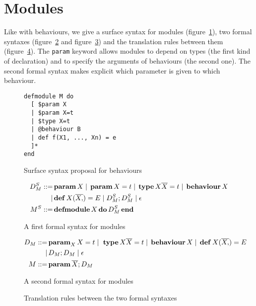 \documentclass[a4paper,11pt]{article}
\newcommand{\kw}[1]{%
  \,\text{\textbf{#1}}\,
}
\newcommand{\pipe}{%
\; | \;
}
\begin{document}
\section{Modules}
Like with behaviours, we give a surface syntax for modules
(figure~\ref{module-surface}), two formal syntaxes (figure~\ref{module-formal1}
and figure~\ref{module-formal2}) and the translation rules between them
(figure~\ref{module-1to2}). The \texttt{param} keyword allows modules to depend
on types (the first kind of declaration) and to specify the arguments of
behaviours (the second one). The second formal syntax makes explicit which
parameter is given to which behaviour.
\begin{figure}[h]
\begin{verbatim}
defmodule M do
  [ $param X
  | $param X=t
  | $type X=t
  | @behaviour B
  | def f(X1, ..., Xn) = e
  ]*
end
\end{verbatim}
\caption{Surface syntax proposal for behaviours}\label{module-surface}
\end{figure}
\begin{figure}[h]
  \begin{align*}
    D_M^S ::=& \kw{param} X \pipe \kw{param} X = t
    \pipe \kw{type} X \overline{X} = t \pipe \kw{behaviour} X \\
    |& \kw{def} X(\overline{X,}) = E \pipe D_M^S; D_M^S \pipe \epsilon \\
    M^S ::=& \kw{defmodule} X \kw{do} D_M^S \kw{end}
  \end{align*}
  \caption{A first formal syntax for modules}\label{module-formal1}
\end{figure}
\begin{figure}[h]
  \begin{align*}
    D_M ::=&\,\text{\textbf{param}}_X\, X = t
    \pipe \,\kw{type}X \overline{X}=t\pipe \kw{behaviour} X
    \pipe \kw{def} X(\overline{X,}) = E\\
    |&\, D_M; D_M \pipe \epsilon \\
    M ::=& \kw{param} \overline{X}; D_M
  \end{align*}
  \caption{A second formal syntax for modules}\label{module-formal2}
\end{figure}
\begin{figure}[h]
  \caption{Translation rules between the two formal syntaxes}\label{module-1to2}
\end{figure}
\end{document}
